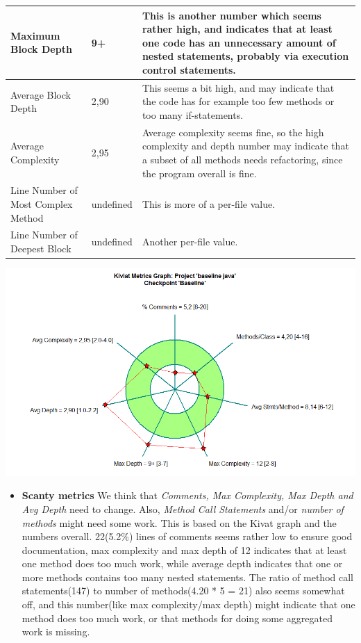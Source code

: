 \documentclass{article}
\begin{document}
\begin{tabulary}{1.0\textwidth}{| P{3cm} | P{2.7cm} | p{8.5cm} |}
	Maximum Block Depth & 9+ & This is another number which seems rather high, and 
	indicates that at least one code has an unnecessary amount of nested statements,
	probably via execution control statements.\\ \hline
	Average Block Depth & 2,90 & This seems a bit high, and may indicate that the
	code has for example too few methods or too many if-statements.\\ \hline
	Average Complexity & 2,95 & Average complexity seems fine, so the high complexity
	and depth number may indicate that a subset of all methods needs refactoring, since
	the program overall is fine.\\ \hline
	Line Number of Most Complex Method & undefined & This is more of a per-file value.\\ \hline
	Line Number of Deepest Block & undefined & Another per-file value. \\ \hline
\end{tabulary}
\pagebreak

\includegraphics[scale=0.5]{Hangman-Kiviat-before.png}


\begin{itemize}
\item
\vspace{0.2cm}
	\textbf{Scanty metrics\newline}
 We think that \textit{Comments, Max Complexity, Max Depth and Avg Depth}
need to change. Also, \textit{Method Call Statements} and/or \textit{number of methods} might need some work.
 This is based on the Kivat graph and the numbers overall. 22(5.2\%) lines of comments seems
  rather low to ensure good documentation, max complexity and max depth of 12 indicates that
   at least one method does too much work, while average depth indicates that one or more
    methods contains too many nested statements. The ratio of method call statements(147)
     to number of methods(4.20 * 5 = 21) also seems somewhat off, and this number(like max
      complexity/max depth) might indicate that one method does too much work, or that methods
       for doing some aggregated work is missing. 

\end{itemize}
\end{document}
